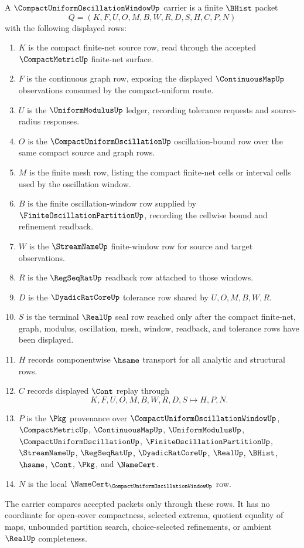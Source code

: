 \begin{definition}
\label{def:compact-uniform-oscillation-window-carrier}
A $\CompactUniformOscillationWindowUp$ carrier is a finite $\BHist$ packet
$$
Q=(K,F,U,O,M,B,W,R,D,S,H,C,P,N)
$$
with the following displayed rows:
\begin{enumerate}
\item $K$ is the compact finite-net source row, read through the accepted $\CompactMetricUp$ finite-net surface.
\item $F$ is the continuous graph row, exposing the displayed $\ContinuousMapUp$ observations consumed by the compact-uniform route.
\item $U$ is the $\UniformModulusUp$ ledger, recording tolerance requests and source-radius responses.
\item $O$ is the $\CompactUniformOscillationUp$ oscillation-bound row over the same compact source and graph rows.
\item $M$ is the finite mesh row, listing the compact finite-net cells or interval cells used by the oscillation window.
\item $B$ is the finite oscillation-window row supplied by $\FiniteOscillationPartitionUp$, recording the cellwise bound and refinement readback.
\item $W$ is the $\StreamNameUp$ finite-window row for source and target observations.
\item $R$ is the $\RegSeqRatUp$ readback row attached to those windows.
\item $D$ is the $\DyadicRatCoreUp$ tolerance row shared by $U,O,M,B,W,R$.
\item $S$ is the terminal $\RealUp$ seal row reached only after the compact finite-net, graph, modulus, oscillation, mesh, window, readback, and tolerance rows have been displayed.
\item $H$ records componentwise $\hsame$ transport for all analytic and structural rows.
\item $C$ records displayed $\Cont$ replay through
$$
K,F,U,O,M,B,W,R,D,S \longmapsto H,P,N .
$$
\item $P$ is the $\Pkg$ provenance over $\CompactUniformOscillationWindowUp$, $\CompactMetricUp$, $\ContinuousMapUp$, $\UniformModulusUp$, $\CompactUniformOscillationUp$, $\FiniteOscillationPartitionUp$, $\StreamNameUp$, $\RegSeqRatUp$, $\DyadicRatCoreUp$, $\RealUp$, $\BHist$, $\hsame$, $\Cont$, $\Pkg$, and $\NameCert$.
\item $N$ is the local $\NameCert_{\CompactUniformOscillationWindowUp}$ row.
\end{enumerate}
The carrier compares accepted packets only through these rows. It has no coordinate for open-cover compactness, selected extrema, quotient equality of maps, unbounded partition search, choice-selected refinements, or ambient $\RealUp$ completeness.
\end{definition}

